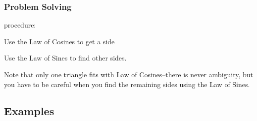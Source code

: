 \documentclass{exam}
\begin{document}
  \subsubsection{Problem Solving}

  procedure:
  \begin{itemize*}
    \item Use the Law of Cosines to get a side
    \item Use the Law of Sines to find other sides.    
  \end{itemize*}

  Note that only one triangle fits with Law of Cosines--there is never ambiguity, but you have to be careful when you
  find the remaining sides using the Law of Sines.

  \subsection{Examples}
\end{document}
